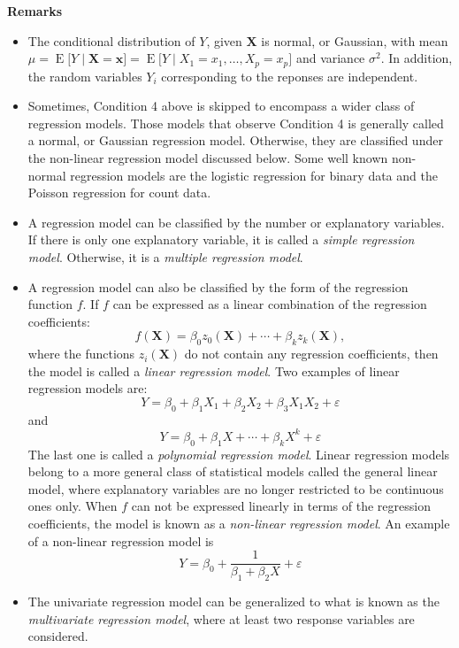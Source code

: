 \documentclass[12pt]{article}
\begin{document}
\textbf{Remarks}
\begin{itemize}
\item The conditional distribution of $Y$, given $\textbf{X}$ is normal, or Gaussian, with mean $\mu=\operatorname{E}\big[Y\mid\textbf{X}=\boldsymbol{x}\big]=\operatorname{E} \big[Y\mid X_1=x_1,\ldots,X_p=x_p\big]$ and variance $\sigma^2$.  In addition, the random variables $Y_i$ corresponding to the reponses are independent.
\item Sometimes, Condition 4 above is skipped to encompass a wider class of regression models.  Those models that observe Condition 4 is generally called a normal, or Gaussian regression model.  Otherwise, they are classified under the non-linear regression model discussed below.  Some well known non-normal regression models are the logistic regression for binary data and the Poisson regression for count data.
\item A regression model can be classified by the number or explanatory variables.  If there is only one explanatory variable, it is called a \emph{simple regression model}.  Otherwise, it is a \emph{multiple regression model}.
\item A regression model can also be classified by the form of the regression function $f$.  If $f$ can be expressed as a linear combination of the regression coefficients:
$$f(\textbf{X})=\beta_0z_0(\textbf{X})+\cdots+\beta_kz_k(\textbf{X}),$$
where the functions $z_i(\textbf{X})$ do not contain any regression coefficients, then the model is called a \emph{linear regression model}.  Two examples of linear regression models are:
$$Y=\beta_0+\beta_1X_1+\beta_2X_2+\beta_3X_1X_2+\varepsilon$$
and 
$$Y=\beta_0+\beta_1X+\cdots+\beta_kX^k+\varepsilon$$
The last one is called a \emph{polynomial regression model}.  Linear regression models belong to a more general class of statistical models called the general linear model, where explanatory variables are no longer restricted to be continuous ones only.  When $f$ can not be expressed linearly in terms of the regression coefficients, the model is known as a \emph{non-linear regression model}.  An example of a non-linear regression model is $$Y=\beta_0+\frac{1}{\beta_1+\beta_2X}+\varepsilon$$
\item The univariate regression model can be generalized to what is known as the \emph{multivariate regression model}, where at least two response variables are considered.
\end{itemize}
\end{document}
